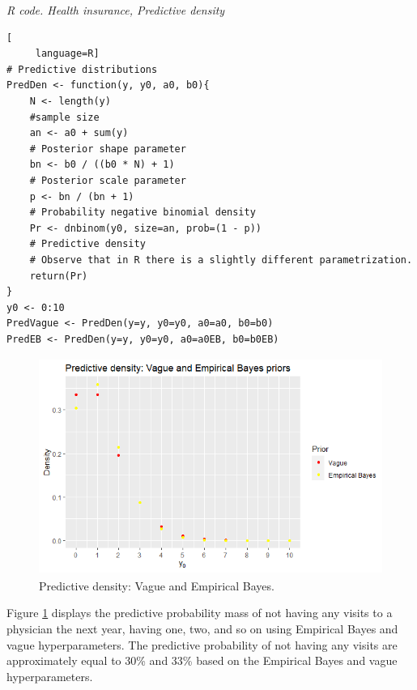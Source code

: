 \clearpage
\begin{tcolorbox}[enhanced,width=4.67in,center upper,
	fontupper=\large\bfseries,drop shadow southwest,sharp corners]
\textit{R code. Health insurance, Predictive density}
\begin{VF}
\begin{lstlisting}[
	 language=R]
# Predictive distributions
PredDen <- function(y, y0, a0, b0){
	N <- length(y)
	#sample size
	an <- a0 + sum(y) 
	# Posterior shape parameter
	bn <- b0 / ((b0 * N) + 1) 
	# Posterior scale parameter
	p <- bn / (bn + 1) 
	# Probability negative binomial density
	Pr <- dnbinom(y0, size=an, prob=(1 - p))
	# Predictive density
	# Observe that in R there is a slightly different parametrization.
	return(Pr)
}
y0 <- 0:10
PredVague <- PredDen(y=y, y0=y0, a0=a0, b0=b0)
PredEB <- PredDen(y=y, y0=y0, a0=a0EB, b0=b0EB)
\end{lstlisting}
\end{VF}
\end{tcolorbox}

\begin{figure}[!h]
	\includegraphics[width=340pt, height=200pt]{Chapters/chapter1/figures/Predictive.png}
	\caption[List of figure caption goes here]{Predictive density: Vague and Empirical Bayes.}\label{fig14}
\end{figure}

Figure \ref{fig14} displays the predictive probability mass of not having any visits to a physician the next year, having one, two, and so on using Empirical Bayes and vague hyperparameters. The predictive probability of not having any visits are approximately equal to 30\% and 33\% based on the Empirical Bayes and vague hyperparameters. 

